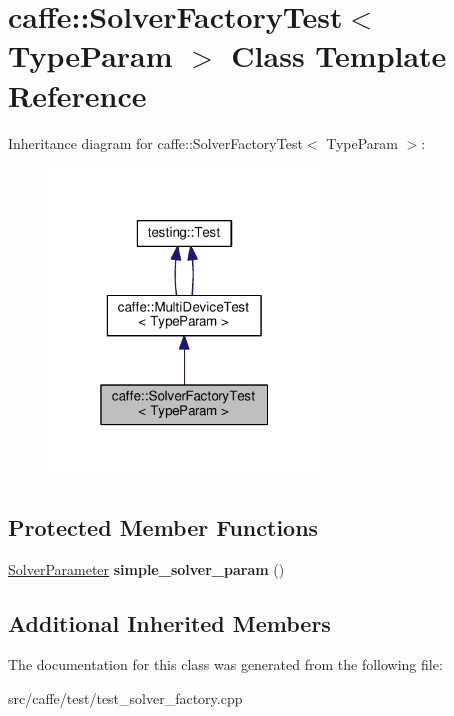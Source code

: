 \hypertarget{classcaffe_1_1_solver_factory_test}{}\section{caffe\+:\+:Solver\+Factory\+Test$<$ Type\+Param $>$ Class Template Reference}
\label{classcaffe_1_1_solver_factory_test}


Inheritance diagram for caffe\+:\+:Solver\+Factory\+Test$<$ Type\+Param $>$\+:
\nopagebreak
\begin{figure}[H]
\begin{center}
\leavevmode
\includegraphics[width=205pt]{classcaffe_1_1_solver_factory_test__inherit__graph}
\end{center}
\end{figure}
\subsection*{Protected Member Functions}
\begin{DoxyCompactItemize}
\item 
\mbox{\label{classcaffe_1_1_solver_factory_test_a9bd2105e3211516c390e7346af89ca7d}} 
\mbox{\hyperlink{classcaffe_1_1_solver_parameter}{Solver\+Parameter}} {\bfseries simple\+\_\+solver\+\_\+param} ()
\end{DoxyCompactItemize}
\subsection*{Additional Inherited Members}


The documentation for this class was generated from the following file\+:\begin{DoxyCompactItemize}
\item 
src/caffe/test/test\+\_\+solver\+\_\+factory.\+cpp\end{DoxyCompactItemize}
